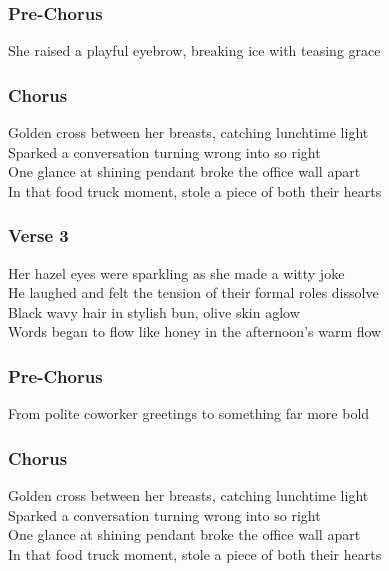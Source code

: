 \subsubsection{Pre-Chorus}\label{pre-chorus-61}

She raised a playful eyebrow, breaking ice with teasing grace

\subsubsection{Chorus}\label{chorus-81}

Golden cross between her breasts, catching lunchtime light\\
Sparked a conversation turning wrong into so right\\
One glance at shining pendant broke the office wall apart\\
In that food truck moment, stole a piece of both their hearts

\subsubsection{Verse 3}\label{verse-3-18}

Her hazel eyes were sparkling as she made a witty joke\\
He laughed and felt the tension of their formal roles dissolve\\
Black wavy hair in stylish bun, olive skin aglow\\
Words began to flow like honey in the afternoon's warm flow

\subsubsection{Pre-Chorus}\label{pre-chorus-62}

From polite coworker greetings to something far more bold

\subsubsection{Chorus}\label{chorus-82}

Golden cross between her breasts, catching lunchtime light\\
Sparked a conversation turning wrong into so right\\
One glance at shining pendant broke the office wall apart\\
In that food truck moment, stole a piece of both their hearts

